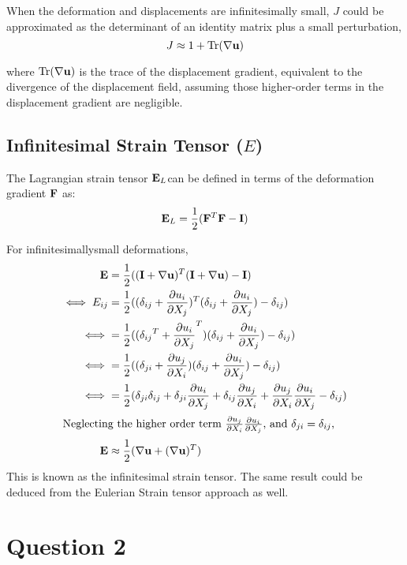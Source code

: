 \documentclass[a4paper,12pt]{article} %
\begin{document}
When the deformation and displacements are infinitesimally small, \(J\) could be approximated as the determinant of an identity matrix plus a small perturbation,
\[ J \approx 1 + \text{Tr}(\nabla \mathbf{u}) \]

where \(\text{Tr}(\nabla \mathbf{u})\) is the trace of the displacement gradient, equivalent to the divergence of the displacement field, assuming those higher-order terms in the displacement gradient are negligible.

\subsection{Infinitesimal Strain Tensor (\(E\))}

The Lagrangian strain tensor \({\mathbf{E}}_{L}\)can be defined in terms of the deformation gradient $\mathbf{F}$ as:
\[ {\mathbf{E}}_{L} = \frac{1}{2}({\mathbf{F}}^T \mathbf{F} - \mathbf{I}) \]

For infinitesimallysmall deformations, %
\begin{align*}
{\mathbf{E}} & = \frac{1}{2}((\mathbf{I} + \nabla \mathbf{u})^T(\mathbf{I} + \nabla \mathbf{u}) - \mathbf{I}) \\
\iff E_{ij} & = \frac{1}{2} ((\delta_{ij} + \frac{\partial u_i}{\partial X_j})^T(\delta_{ij} + \frac{\partial u_i}{\partial X_j}) - \delta_{ij}) \\
\iff & = \frac{1}{2} (({\delta_{ij}}^T + {\frac{\partial u_i}{\partial X_j}}^T)(\delta_{ij} + \frac{\partial u_i}{\partial X_j}) - \delta_{ij}) \\
\iff & = \frac{1}{2} (({\delta_{ji}} + {\frac{\partial u_j}{\partial X_i}})(\delta_{ij} + \frac{\partial u_i}{\partial X_j}) - \delta_{ij}) \\
\iff & = \frac{1}{2} ({\delta_{ji}} {\delta_{ij}} + {\delta_{ji}}{\frac{\partial u_i}{\partial X_j}} + \delta_{ij}\frac{\partial u_j}{\partial X_i} +\frac{\partial u_j}{\partial X_i}\frac{\partial u_i}{\partial X_j} - \delta_{ij}) \\
\intertext{Neglecting the higher order term $\frac{\partial u_j}{\partial X_i}\frac{\partial u_i}{\partial X_j}$, and $\delta_{ji}=\delta_{ij}$,}
{\mathbf{E}} & \approx \frac{1}{2}(\nabla \mathbf{u} + (\nabla \mathbf{u})^T)
\end{align*}
This is known as the infinitesimal strain tensor. The same result could be deduced from the Eulerian Strain tensor approach as well.

\newpage

\section{\textbf{Question 2}}
\end{document}
